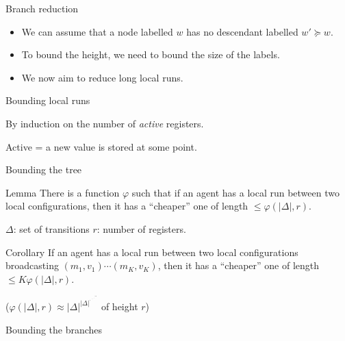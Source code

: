 \documentclass{beamer}
\begin{document}
\begin{frame}{Branch reduction}
	\begin{itemize}
		\item We can assume that a node labelled $w$ has no descendant labelled $w' \succeq w$.
		
		\item To bound the height, we need to bound the size of the labels.
		
		\item We now aim to reduce long local runs.
	\end{itemize}
\end{frame}

\begin{frame}{Bounding local runs}
	
	
	By induction on the number of \color{blue}\emph{active }\color{black} registers.
	
	\color{purple}Active \color{black} = a new value is stored at some point.
	\vspace{0.5cm}
	
	
	
\end{frame}

\begin{frame}{Bounding the tree}
	
	\begin{block}{Lemma}
		There is a function $\varphi$ such that if an agent has a local run between two local configurations, then it has a ``cheaper'' one of length $\leq \varphi(|\Delta|,r)$. 
	\end{block}
	
	$\Delta$: set of transitions \hspace{1cm} $r$: number of registers.
	
	\begin{block}{Corollary}
		If an agent has a local run between two local configurations broadcasting  $(m_1,v_1) \cdots (m_K, v_K)$, then it has a ``cheaper'' one of length $\leq K\varphi(|\Delta|,r)$. 
	\end{block}
	
	\pause
	($\varphi(|\Delta|,r) \approx |\Delta|^{|\Delta|^{{\mathbf{\cdot}~}^{\mathbf{\cdot~}^{\mathbf{\cdot~}^{^{|\Delta|}}}}}}$ of height $r$)
\end{frame}

\begin{frame}{Bounding the branches}
	
	

\end{frame}
\end{document}
